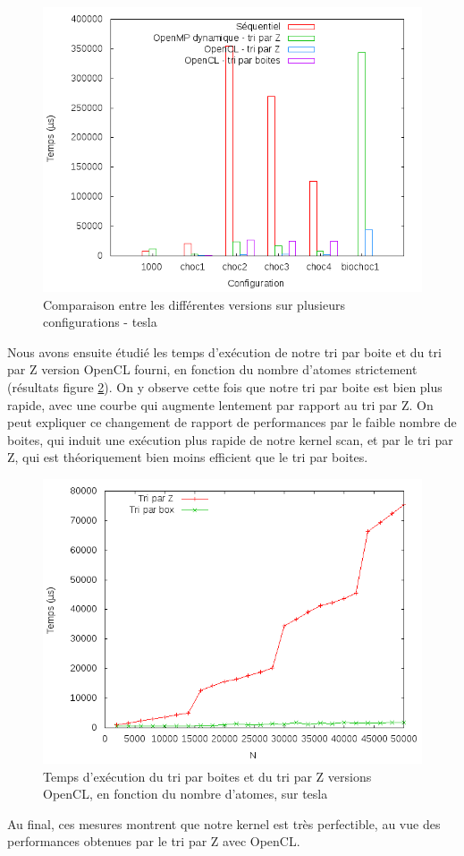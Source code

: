 \documentclass[]{article}
\begin{document}
\begin{figure}[H]
  \centering
  \includegraphics[scale=0.5]{Courbe/tesla/histo/histogram.png} 
  \caption{Comparaison entre les différentes versions sur plusieurs configurations - tesla}
  \label{fig:histo-tesla}
\end{figure}

Nous avons ensuite étudié les temps d'exécution de notre tri par boite et du tri par Z version OpenCL fourni, en fonction du nombre d'atomes strictement (résultats figure \ref{fig:atoms-tesla}). On y observe cette fois que notre tri par boite est bien plus rapide, avec une courbe qui augmente lentement par rapport au tri par Z. On peut expliquer ce changement de rapport de performances par le faible nombre de boites, qui induit une exécution plus rapide de notre kernel scan, et par le tri par Z, qui est théoriquement bien moins efficient que le tri par boites. \\

\begin{figure}[H]
  \centering
  \includegraphics[scale=0.5]{Courbe/tesla/biochoc1/ocl_z-ocl_box.png} 
  \caption{Temps d'exécution du tri par boites et du tri par Z versions OpenCL, en fonction du nombre d'atomes, sur tesla}
  \label{fig:atoms-tesla}
\end{figure}

Au final, ces mesures montrent que notre kernel est très perfectible, au vue des performances obtenues par le tri par Z avec OpenCL.
\end{document}
